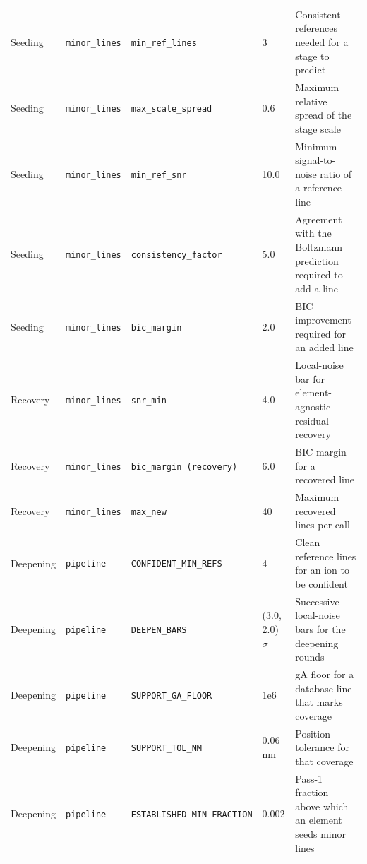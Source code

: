 \begin{table}[!htbp]
\begin{tabular}{@{}p{}p{}p{}p{}p{}@{}}
Seeding & \texttt{minor\_\allowbreak{}lines} & \texttt{min\_\allowbreak{}ref\_\allowbreak{}lines} & 3 & Consistent references needed for a stage to predict \\
Seeding & \texttt{minor\_\allowbreak{}lines} & \texttt{max\_\allowbreak{}scale\_\allowbreak{}spread} & 0.6 & Maximum relative spread of the stage scale \\
Seeding & \texttt{minor\_\allowbreak{}lines} & \texttt{min\_\allowbreak{}ref\_\allowbreak{}snr} & 10.0 & Minimum signal-to-noise ratio of a reference line \\
Seeding & \texttt{minor\_\allowbreak{}lines} & \texttt{consistency\_\allowbreak{}factor} & 5.0 & Agreement with the Boltzmann prediction required to add a line \\
Seeding & \texttt{minor\_\allowbreak{}lines} & \texttt{bic\_\allowbreak{}margin} & 2.0 & BIC improvement required for an added line \\
Recovery & \texttt{minor\_\allowbreak{}lines} & \texttt{snr\_\allowbreak{}min} & 4.0 & Local-noise bar for element-agnostic residual recovery \\
Recovery & \texttt{minor\_\allowbreak{}lines} & \texttt{bic\_\allowbreak{}margin (recovery)} & 6.0 & BIC margin for a recovered line \\
Recovery & \texttt{minor\_\allowbreak{}lines} & \texttt{max\_\allowbreak{}new} & 40 & Maximum recovered lines per call \\
Deepening & \texttt{pipeline} & \texttt{CONFIDENT\_\allowbreak{}MIN\_\allowbreak{}REFS} & 4 & Clean reference lines for an ion to be confident \\
Deepening & \texttt{pipeline} & \texttt{DEEPEN\_\allowbreak{}BARS} & (3.0, 2.0) $\sigma$ & Successive local-noise bars for the deepening rounds \\
Deepening & \texttt{pipeline} & \texttt{SUPPORT\_\allowbreak{}GA\_\allowbreak{}FLOOR} & 1e6 & gA floor for a database line that marks coverage \\
Deepening & \texttt{pipeline} & \texttt{SUPPORT\_\allowbreak{}TOL\_\allowbreak{}NM} & 0.06 nm & Position tolerance for that coverage \\
Deepening & \texttt{pipeline} & \texttt{ESTABLISHED\_\allowbreak{}MIN\_\allowbreak{}FRACTION} & 0.002 & Pass-1 fraction above which an element seeds minor lines \\
\bottomrule
\end{tabular}
\end{table}

